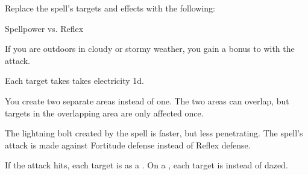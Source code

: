 


Replace the spell's targets and effects with the following:
\begin{spellcontent}

\begin{augmenttargetinginfo}




\end{augmenttargetinginfo}


\begin{augmenteffects}




\begin{spellattack}{Spellpower vs. Reflex}


\spellspecial
If you are outdoors in cloudy or stormy weather, you gain a  bonus to  with the attack.



\hit
Each target takes takes electricity  \plus1d.



\end{spellattack}



\end{augmenteffects}

\end{spellcontent}






You create two separate areas instead of one.
The two areas can overlap, but targets in the overlapping area are only affected once.







The lightning bolt created by the spell is faster, but less penetrating.
The spell's attack is made against Fortitude defense instead of Reflex defense.







If the attack hits, each target is  as a .
On a , each target is  instead of dazed.






